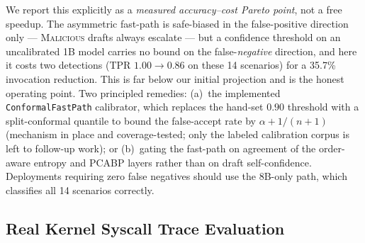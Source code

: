 \documentclass[journal]{IEEEtran}
\begin{document}
We report this explicitly as a \emph{measured accuracy--cost Pareto point},
not a free speedup.  The asymmetric fast-path is safe-biased in the
false-positive direction only --- \textsc{Malicious} drafts always escalate
--- but a confidence threshold on an uncalibrated 1B model carries no bound
on the false-\emph{negative} direction, and here it costs two detections
(TPR $1.00\!\to\!0.86$ on these 14 scenarios) for a 35.7\% invocation
reduction.  This is far below our initial projection and is the honest
operating point.  Two principled remedies: (a)~the implemented
\texttt{ConformalFastPath} calibrator, which replaces the hand-set $0.90$
threshold with a split-conformal quantile to bound the false-accept rate by
$\alpha + 1/(n{+}1)$ (mechanism in place and coverage-tested; only the
labeled calibration corpus is left to follow-up work); or
(b)~gating the fast-path on agreement of the order-aware entropy and PCABP
layers rather than on draft self-confidence.
Deployments requiring zero false negatives should use the 8B-only path,
which classifies all 14 scenarios correctly.

\subsection{Real Kernel Syscall Trace Evaluation}\label{sec:eval_real}
\end{document}
